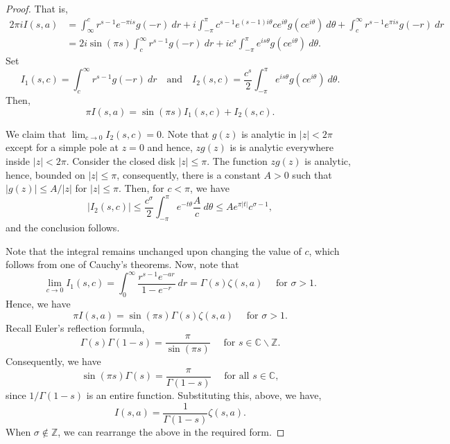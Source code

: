 \documentclass[12pt]{article}
\theoremstyle{thmstyle}
\theoremstyle{defstyle}
\newcommand{\Z}{\mathbb{Z}}
\newcommand{\bbC}{\mathbb{C}}
\renewcommand{\le}{\leqslant}
\begin{document}
\begin{proof}
    That is, 
    \begin{align*}
        2\pi i I(s, a) &= \int_\infty^c r^{s - 1}e^{-\pi is}g(-r)~dr + i\int_{-\pi}^\pi c^{s - 1}e^{(s - 1)i\theta}ce^{i\theta}g(ce^{i\theta})~d\theta + \int_c^\infty r^{s - 1} e^{\pi i s} g(-r)~dr\\
        &= 2i\sin(\pi s)\int_c^\infty r^{s - 1}g(-r)~dr + ic^s\int_{-\pi}^\pi e^{is\theta}g(ce^{i\theta})~d\theta.
    \end{align*}
    Set 
    \begin{equation*}
        I_1(s, c) = \int_c^\infty r^{s - 1}g(-r)~dr\quad\text{and}\quad I_2(s,c) = \frac{c^s}{2}\int_{-\pi}^\pi e^{is\theta}g(ce^{i\theta})~d\theta.
    \end{equation*}
    Then, 
    \begin{equation*}
        \pi I(s, a) = \sin(\pi s) I_1(s,c) + I_2(s, c).
    \end{equation*}

    We claim that $\displaystyle\lim_{c\to 0} I_2(s, c) = 0$. Note that $g(z)$ is analytic in $|z| < 2\pi$ except for a simple pole at $z = 0$ and hence, $zg(z)$ is is analytic everywhere inside $|z| < 2\pi$. Consider the closed disk $|z|\le\pi$. The function $zg(z)$ is analytic, hence, bounded on $|z|\le\pi$, consequently, there is a constant $A > 0$ such that $|g(z)|\le A/|z|$ for $|z|\le\pi$. Then, for $c < \pi$, we have 
    \begin{equation*}
        |I_2(s, c)|\le\frac{c^\sigma}{2}\int_{-\pi}^\pi e^{-t\theta}\frac{A}{c}~d\theta\le Ae^{\pi|t|}c^{\sigma - 1},
    \end{equation*}
    and the conclusion follows.

    Note that the integral remains unchanged upon changing the value of $c$, which follows from one of Cauchy's theorems. Now, note that 
    \begin{equation*}
        \lim_{c\to 0}I_1(s, c ) = \int_{0}^\infty\frac{r^{s - 1}e^{-ar}}{1 - e^{-r}}~dr = \Gamma(s)\zeta(s, a)\quad\text{ for } \sigma > 1.
    \end{equation*}
    Hence, we have 
    \begin{equation*}
        \pi I(s, a) = \sin(\pi s)\Gamma(s)\zeta(s, a)\quad\text{ for }\sigma > 1.
    \end{equation*}
    Recall Euler's reflection formula, 
    \begin{equation*}
        \Gamma(s)\Gamma(1 - s) = \frac{\pi}{\sin(\pi s)}\quad\text{ for } s\in\bbC\backslash\Z.
    \end{equation*}
    Consequently, we have 
    \begin{equation*}
        \sin(\pi s)\Gamma(s) = \frac{\pi}{\Gamma(1 - s)}\quad\text{ for all } s\in\bbC,
    \end{equation*}
    since $1/\Gamma(1 - s)$ is an entire function. Substituting this, above, we have, 
    \begin{equation*}
        I(s, a) = \frac{1}{\Gamma(1 - s)}\zeta(s, a).
    \end{equation*}
    When $\sigma\notin\Z$, we can rearrange the above in the required form.
\end{proof}
\end{document}
